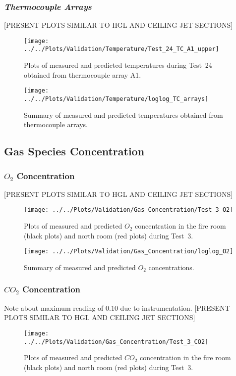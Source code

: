 \clearpage
\subsubsection*{\textit{Thermocouple Arrays}}
[PRESENT PLOTS SIMILAR TO HGL AND CEILING JET SECTIONS]
\begin{figure}[!h]
	\centering
	\texttt{[image: ../../Plots/Validation/Temperature/Test\_24\_TC\_A1\_upper]}
	\caption[Plots of measured and predicted thermocouple array temperatures during Test~24.]{Plots of measured and predicted temperatures during Test~24 obtained from thermocouple array A1.}
	\label{fig:TCarray_data}
\end{figure}

\begin{figure}[!h]
	\centering
	\texttt{[image: ../../Plots/Validation/Temperature/loglog\_TC\_arrays]}
	\caption{Summary of measured and predicted temperatures obtained from thermocouple arrays.}
	\label{fig:loglog_TC_arrays}
\end{figure}

\clearpage
\subsection{Gas Species Concentration}

\subsubsection*{\textit{$O_2$} Concentration}
[PRESENT PLOTS SIMILAR TO HGL AND CEILING JET SECTIONS]
\begin{figure}[!h]
	\centering
	\texttt{[image: ../../Plots/Validation/Gas\_Concentration/Test\_3\_O2]}
	\caption[Plots of measured and predicted $O_2$ concentration during Test~3.]{Plots of measured and predicted $O_2$ concentration in the fire room (black plots) and north room (red plots) during Test~3.}
	\label{fig:Test3_O2}
\end{figure}

\begin{figure}[!h]
	\centering
	\texttt{[image: ../../Plots/Validation/Gas\_Concentration/loglog\_O2]}
	\caption{Summary of measured and predicted $O_2$ concentrations.}
	\label{fig:loglog_O2}
\end{figure}

\FloatBarrier
\subsubsection*{\textit{$CO_2$} Concentration}
Note about maximum reading of 0.10 due to instrumentation. [PRESENT PLOTS SIMILAR TO HGL AND CEILING JET SECTIONS]
\begin{figure}[!h]
	\centering
	\texttt{[image: ../../Plots/Validation/Gas\_Concentration/Test\_3\_CO2]}
	\caption[Plots of measured and predicted $CO_2$ concentration during Test~3.]{Plots of measured and predicted $CO_2$ concentration in the fire room (black plots) and north room (red plots) during Test~3.}
	\label{fig:Test3_CO2}
\end{figure}

